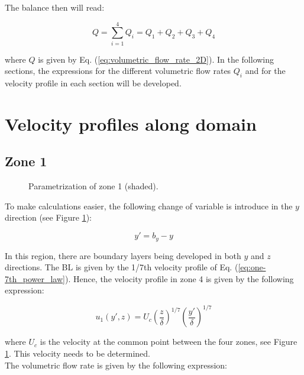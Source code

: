 The balance then will read:

\begin{equation}
\label{eq:3D_BL_Qconservation}
Q = \sum_{i=1}^4 Q_i = Q_1 + Q_2 + Q_3 + Q_4
\end{equation}

where $Q$ is given by Eq. (\ref{eq:volumetric_flow_rate_2D}). In the following sections, the expressions for the different volumetric flow rates $Q_i$ and for the velocity profile in each section will be developed.

\section{Velocity profiles along domain}

\subsection{Zone 1}

\begin{figure}[h!]	
	\centering
%	
	\caption{Parametrization of zone 1 (shaded).}
	\label{fig:param_z1}
\end{figure}

To make calculations easier, the following change of variable is introduce in the $y$ direction (see Figure \ref{fig:param_z1}):

\begin{equation}
\label{eq:zone1_change_of_variable}
y' = b_y - y
\end{equation}

In this region, there are boundary layers being developed in both $y$ and $z$ directions. The BL is given by the 1/7th velocity profile of Eq. (\ref{eq:one-7th_power_law}). Hence, the velocity profile in zone 4 is given by the following expression:

\begin{equation}
\label{eq:3DBL_profile_u1}
\boxed{
u_1 \left( y', z \right) = U_c \left( \frac{z}{\delta} \right)^{1/7} \left( \frac{y'}{\delta} \right)^{1/7}
}
\end{equation}

where $U_c$ is the velocity at the common point between the four zones, see Figure \ref{fig:param_z1}. This velocity needs to be determined.\\

The volumetric flow rate is given by the following expression:

